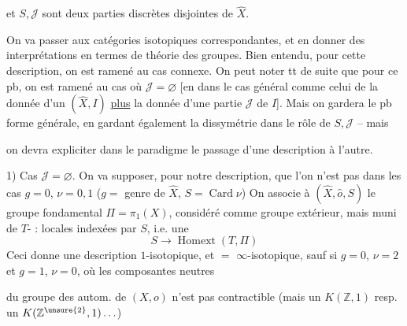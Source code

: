 et $S,\mathcal J$ sont deux parties discrètes disjointes de $\widehat X$.

On va  passer aux catégories isotopiques correspondantes, et en donner des interprétations en termes de théorie des groupes. Bien entendu, pour cette description, on est ramené au cas connexe. On peut  noter tt de suite que pour ce pb, on est ramené au cas où $\mathcal J=\varnothing$ [en  dans le cas général comme celui de la donnée d'un $(\widehat X,I)$ \uline{plus} la donnée d'une partie $\mathcal J$ de $I$]. Mais on gardera le pb   forme générale, en gardant également la dissymétrie dans le rôle de $S,\mathcal J$ -- mais

on devra expliciter dans le paradigme
le passage d'une description à
l'autre.


1) Cas $\mathcal J=\varnothing$. On va supposer, pour
notre description, que l'on n'est
pas dans les cas $g=0$, $\nu=0,1$
($g=$ genre de $\widehat X$, $S=\operatorname{Card}\nu$)
On associe à $(\widehat X,\widehat o,S)$  le
groupe fondamental $\Pi=\pi_1(X)$, considéré
comme groupe extérieur, mais
muni de  $T$- :
locales indexées par $S$, i.e. une
\[
S\longrightarrow\operatorname{Homext}(T,\Pi)
\]
Ceci donne \inserted{\textcircled{$=$}} une description
$1$-isotopique, et $=$ $\infty$-isotopique,
sauf si $g=0$, $\nu=2$ et $g=1$, $\nu=0$,
où les composantes neutres

du groupe des autom. de $(X,o)$
n'est pas contractible (mais un
$K(\mathbb Z,1)$ resp. un $K(\mathbb Z^{\unsure{2}},1)\ldots$)

